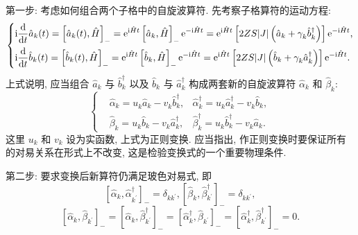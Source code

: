 第一步: 考虑如何组合两个子格中的自旋波算符. 先考察子格算符的运动方程:
\begin{equation}
\left\{\begin{aligned}
&\mathrm{i} \frac{\mathrm{d}}{\mathrm{d} t}\hat{a}_{k}(t)=\left[\hat a_{k}(t),\hat H\right]_-=\mathrm{e}^{\mathrm{i}\hat{H}t}\left[\hat a_{k},\hat H\right]_- \mathrm{e}^{-\mathrm{i}\hat{H}t}=\mathrm{e}^{\mathrm{i}\hat{H}t} \left[  2 Z S|J|\left(\hat a_{k}+\gamma^{}_{k} \hat b_{k}^{\dagger}\right) \right] \mathrm{e}^{-\mathrm{i}\hat{H}t},\\
&\mathrm{i} \frac{\mathrm{d}}{\mathrm{d} t}\hat{b}_{k}(t)=\left[\hat b_{k}(t),\hat H\right]_-=\mathrm{e}^{\mathrm{i}\hat{H}t}\left[\hat b_{k},\hat H\right]_- \mathrm{e}^{-\mathrm{i}\hat{H}t}=\mathrm{e}^{\mathrm{i}\hat{H}t} \left[  2 Z S|J|\left(\hat b_{k}+\gamma^{}_{k} \hat a_{k}^{\dagger}\right) \right] \mathrm{e}^{-\mathrm{i}\hat{H}t}.
\end{aligned}\right.
\end{equation}
上式说明, 应当组合 $\hat a^{}_{k}$ 与 $\hat b_{k}^{\dagger}$ 以及 $\hat b^{}_{k}$ 与 $\hat a_{k}^{\dagger}$ 构成两套新的自旋波算符 $\hat \alpha_{k}$ 和 $\hat \beta_{k}$:
\begin{equation}
\left\{\begin{aligned}
&\hat \alpha^{}_{k}=u^{}_{k} \hat a^{}_{k}-v^{}_{k} \hat b_{k}^{\dagger}, & \hat \alpha_{k}^{\dagger}=u^{}_{k} \hat a_{k}^{\dagger}-v^{}_{k} \hat b^{}_{k}, \\
&\hat \beta^{}_{k}=u^{}_{k} \hat b^{}_{k}-v^{}_{k} \hat a_{k}^{\dagger}, & \hat \beta_{k}^{\dagger}=u^{}_{k} \hat b_{k}^{\dagger}-v^{}_{k} \hat a^{}_{k}.
\end{aligned}\right.
\end{equation}
这里 $u_{k}$ 和 $v_{k}$ 设为实函数, 上式为正则变换. 应当指出, 作正则变换时要保证所有的对易关系在形式上不改变, 这是检验变换式的一个重要物理条件.

第二步: 要求变换后新算符仍满足玻色对易式, 即
\begin{equation}
\left[\hat \alpha^{}_{k}, \hat \alpha_{k^{\prime}}^{\dagger}\right]_-=\delta_{k k^{\prime}},\left[\hat \beta^{}_{k}, \hat \beta_{k^{\prime}}^{\dagger}\right]_-=\delta_{k k^{\prime}},
\end{equation}
\begin{equation}
\left[\hat \alpha_{k}, \hat \beta_{k^{\prime}}\right]_-=\left[\hat \alpha^{}_{k}, \hat \beta_{k^{\prime}}^{\dagger}\right]_-=\left[\hat \alpha_{k}^{\dagger}, \hat \beta^{}_{k^{\prime}}\right]_-=\left[\hat \alpha_{k}^{\dagger}, \hat \beta_{k^{\prime}}^{\dagger}\right]_-=0.
\end{equation}

